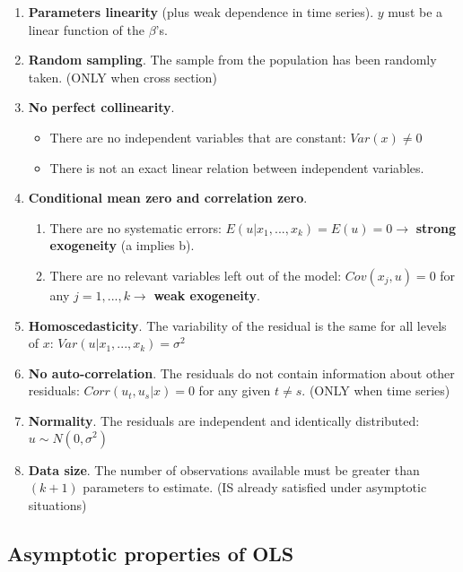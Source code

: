 \documentclass[10pt, a4paper, landscape]{extarticle}
\begin{document}
\begin{multicols}{3}
\begin{enumerate}[leftmargin=*]
\item \textbf{Parameters linearity} (plus weak dependence in time series). $y$ must be a linear function of the $\beta$'s.
\item \textbf{Random sampling}. The sample from the population has been randomly taken. (ONLY when cross section)
\item \textbf{No perfect collinearity}.
\begin{itemize}[leftmargin=*]
\item There are no independent variables that are constant: $Var(x) \neq 0$
\item There is not an exact linear relation between independent variables.
\end{itemize}
\item \textbf{Conditional mean zero and correlation zero}.
\begin{enumerate}[leftmargin=*, label=\alph*.]
\item There are no systematic errors: $E(u | x_1, ..., x_k) = E(u) = 0 \rightarrow$ \textbf{strong exogeneity} (a implies b).
\item There are no relevant variables left out of the model: $Cov(x_j , u) = 0$ for any $j = 1, ..., k \rightarrow$ \textbf{weak exogeneity}.
\end{enumerate}
\item \textbf{Homoscedasticity}. The variability of the residual is the same for all levels of $x$: $Var(u | x_1, ..., x_k) = \sigma^2$
\item \textbf{No auto-correlation}. The residuals do not contain information about other residuals: $Corr(u_t, u_s | x) = 0$ for any given $t \neq s$. (ONLY when time series)
\item \textbf{Normality}. The residuals are independent and identically distributed: $u \sim N(0,\sigma^2)$
\item \textbf{Data size}. The number of observations available must be greater than $(k + 1)$ parameters to estimate. (IS already satisfied under asymptotic situations)
\end{enumerate}

\subsection*{Asymptotic properties of OLS}


\end{multicols}
\end{document}
